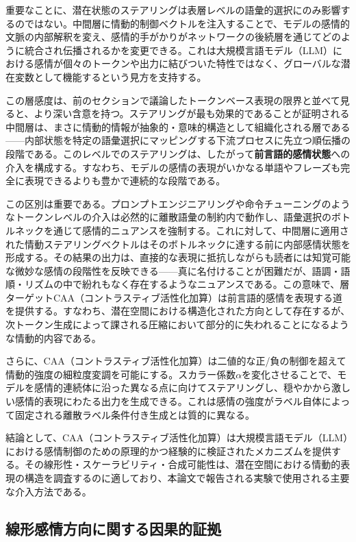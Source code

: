 重要なことに、潜在状態のステアリングは表層レベルの語彙的選択にのみ影響するのではない。中間層に情動的制御ベクトルを注入することで、モデルの感情的文脈の内部解釈を変え、感情的手がかりがネットワークの後続層を通じてどのように統合され伝播されるかを変更できる。これは大規模言語モデル（LLM）における感情が個々のトークンや出力に結びついた特性ではなく、グローバルな潜在変数として機能するという見方を支持する。

この層感度は、前のセクションで議論したトークンベース表現の限界と並べて見ると、より深い含意を持つ。ステアリングが最も効果的であることが証明される中間層は、まさに情動的情報が抽象的・意味的構造として組織化される層である——内部状態を特定の語彙選択にマッピングする下流プロセスに先立つ順伝播の段階である。このレベルでのステアリングは、したがって\textbf{前言語的感情状態}への介入を構成する。すなわち、モデルの感情の表現がいかなる単語やフレーズも完全に表現できるよりも豊かで連続的な段階である。

この区別は重要である。プロンプトエンジニアリングや命令チューニングのようなトークンレベルの介入は必然的に離散語彙の制約内で動作し、語彙選択のボトルネックを通じて感情的ニュアンスを強制する。これに対して、中間層に適用された情動ステアリングベクトルはそのボトルネックに達する前に内部感情状態を形成する。その結果の出力は、直接的な表現に抵抗しながらも読者には知覚可能な微妙な感情の段階性を反映できる——真に名付けることが困難だが、語調・語順・リズムの中で紛れもなく存在するようなニュアンスである。この意味で、層ターゲットCAA（コントラスティブ活性化加算）は前言語的感情を表現する道を提供する。すなわち、潜在空間における構造化された方向として存在するが、次トークン生成によって課される圧縮において部分的に失われることになるような情動的内容である。

さらに、CAA（コントラスティブ活性化加算）は二値的な正/負の制御を超えて情動的強度の細粒度変調を可能にする。スカラー係数$\alpha$を変化させることで、モデルを感情的連続体に沿った異なる点に向けてステアリングし、穏やかから激しい感情的表現にわたる出力を生成できる。これは感情の強度がラベル自体によって固定される離散ラベル条件付き生成とは質的に異なる。

結論として、CAA（コントラスティブ活性化加算）は大規模言語モデル（LLM）における感情制御のための原理的かつ経験的に検証されたメカニズムを提供する。その線形性・スケーラビリティ・合成可能性は、潜在空間における情動的表現の構造を調査するのに適しており、本論文で報告される実験で使用される主要な介入方法である。

\subsection{線形感情方向に関する因果的証拠}

